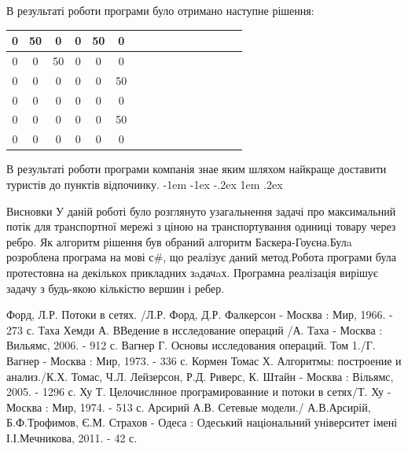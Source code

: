 \documentclass[a4paper,14pt,russian,ukrainian,oneside,final]{extreport}
\makeatletter
\newlength{\fivecharsapprox}
\newlength{\fivecharsapproxs}
\renewcommand\section{%
  \clearpage\@startsection {section}{0}%
    {\fivecharsapproxs}%
    {-1em \@plus -1ex \@minus -.2ex}%
    {1em \@plus .2ex}%
    {\raggedright\hyphenpenalty=10000\normalfont\large\bfseries\MakeUppercase {}}
}
\newcommand\sectioncentered{%
  \clearpage\@startsection {section}{1}%
    {\z@}%
    {-1em \@plus -1ex \@minus -.2ex}%
    {1em \@plus .2ex}%
    {\centering\hyphenpenalty=10000\normalfont\large\bfseries\MakeUppercase}%
    }
\makeatother
\begin{document}
\indent В результаті роботи програми було отримано наступне рішення:
\begin{center}
\begin{tabular}{|c|c|c|c|c|c|c|c|c|c|c|c|c|c|c|c|}
\hline
0&50&0&0&50&0\\ \hline
0&0&50&0&0&0 \\ \hline
0&0&0&0&0&50 \\ \hline
0&0&0&0&0&0  \\ \hline
0&0&0&0&0&50 \\ \hline
0&0&0&0&0&0  \\ \hline
\end{tabular}
\end{center}

В результаті роботи програми компанія знае яким шляхом найкраще доставити туристів до пунктів відпочинку.
\newpage
\section{Висновки}
У даній роботі було розглянуто узагальнення задачі про максимальний потік для транспортної мережі з ціною на транспортування одиниці товару через ребро. Як алгоритм рішення був обраний алгоритм Баскера-Гоуєна.Булa розроблена програма на мові с\#, що реалізує даний метод.Робота програми була протестовна на декількох прикладних зaдачaх.
Програмна реалізація вирішує задачу з будь-якою кількістю вершин і ребер.

\newpage
\renewcommand{\bibsection}{\sectioncentered*{Cписок використанної літератури}}

\begin{thebibliography}{99}
 Форд, Л.Р. Потоки в сетях. /Л.Р. Форд, Д.Р. Фалкерсон - Москва : Мир, 1966. - 273 с.
 Таха Хемди А. ВВедение в исследование операций /А. Таха - Москва : Вильямс, 2006. - 912 с.
Вагнер Г. Основы исследования операций. Том 1./Г. Вагнер - Москва : Мир, 1973. - 336 с.
Кормен Томас Х. Алгоритмы: построение и анализ./К.Х. Томас, Ч.Л. Лейзерсон, Р.Д. Риверс, К. Штайн - Москва : Вільямс, 2005. - 1296 с.
 Ху Т. Целочислнное програмированние и потоки в сетях/Т. Ху - Москва : Мир, 1974. - 513 с.
 Арсирий А.В. Сетевые модели./ А.В.Арсирій, Б.Ф.Трофимов, Є.М. Страхов - Одеса : Одеський національний університет імені І.І.Мечникова, 2011. - 42 с.
\end{thebibliography}
\end{document}
